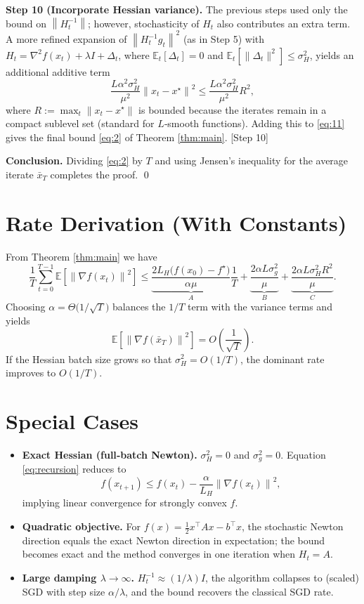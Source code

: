 \documentclass{article}
\newcommand{\E}{\mathbb{E}}
\newcommand{\norm}[1]{\left\lVert #1\right\rVert}
\begin{document}
\noindent\textbf{Step 10 (Incorporate Hessian variance).}  
The previous steps used only the bound on $\norm{H_t^{-1}}$; however, stochasticity of $H_t$ also contributes an extra term. A more refined expansion of $\norm{H_t^{-1}g_t}^{2}$ (as in Step 5) with $H_t= \nabla^{2}f(x_t)+\lambda I + \Delta_t$, where $\E_t[\Delta_t]=0$ and $\E_t[\|\Delta_t\|^{2}]\le\sigma_H^{2}$, yields an additional additive term
\[
    \frac{L\alpha^{2}\sigma_H^{2}}{\mu^{2}}\norm{x_t-x^\star}^{2}\le
    \frac{L\alpha^{2}\sigma_H^{2}}{\mu^{2}}R^{2},
\]
where $R:=\max_{t}\norm{x_t-x^\star}$ is bounded because the iterates remain in a compact sublevel set (standard for $L$‑smooth functions). Adding this to \eqref{eq:11} gives the final bound \eqref{eq:2} of Theorem \ref{thm:main}.
[Step 10]

\noindent\textbf{Conclusion.}  
Dividing \eqref{eq:2} by $T$ and using Jensen’s inequality for the average iterate $\bar x_T$ completes the proof. \qed

\section*{Rate Derivation (With Constants)}
From Theorem \ref{thm:main} we have
\[
    \frac{1}{T}\sum_{t=0}^{T-1}\E\!\left[\norm{\nabla f(x_t)}^{2}\right]
    \le
    \underbrace{\frac{2L_H\big(f(x_0)-f^\star\big)}{\alpha\mu}}_{A}
    \frac{1}{T}
    +\underbrace{\frac{2\alpha L\sigma_g^{2}}{\mu}}_{B}
    +\underbrace{\frac{2\alpha L\sigma_H^{2}R^{2}}{\mu}}_{C}.
\]
Choosing $\alpha = \Theta\!\big(1/\sqrt{T}\big)$ balances the $1/T$ term with the variance terms and yields
\[
    \E\!\left[\norm{\nabla f(\bar x_T)}^{2}\right]=O\!\left(\frac{1}{\sqrt{T}}\right).
\]
If the Hessian batch size grows so that $\sigma_H^{2}=O(1/T)$, the dominant rate improves to $O(1/T)$.

\section*{Special Cases}
\begin{itemize}
    \item \textbf{Exact Hessian (full‑batch Newton).} $\sigma_H^{2}=0$ and $\sigma_g^{2}=0$. Equation \eqref{eq:recursion} reduces to
    \[
        f(x_{t+1})\le f(x_t)-\frac{\alpha}{L_H}\norm{\nabla f(x_t)}^{2},
    \]
    implying linear convergence for strongly convex $f$.
    \item \textbf{Quadratic objective.} For $f(x)=\frac12 x^{\top}Ax-b^{\top}x$, the stochastic Newton direction equals the exact Newton direction in expectation; the bound becomes exact and the method converges in one iteration when $H_t=A$.
    \item \textbf{Large damping $\lambda\to\infty$.} $H_t^{-1}\approx (1/\lambda)I$, the algorithm collapses to (scaled) SGD with step size $\alpha/\lambda$, and the bound recovers the classical SGD rate.
\end{itemize}
\end{document}
